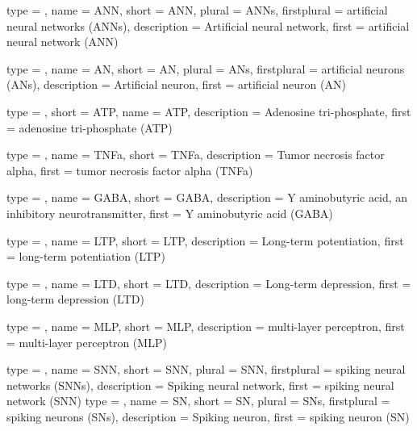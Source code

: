 %
%
%


{
	type        = \acronymtype,
	name        = {ANN},
	short       = {ANN},
	plural      = ANNs,
	firstplural = artificial neural networks (ANNs),
	description = {Artificial neural network},
	first       = {artificial neural network (ANN)}
}

{
	type        = \acronymtype,
	name        = {AN},
	short       = {AN},
	plural      = ANs,
	firstplural = artificial neurons (ANs),
	description = {Artificial neuron},
	first       = {artificial neuron (AN)}
}

{
	type        = \acronymtype,
	short       = {ATP},
  	name        = {ATP},
	description = {Adenosine tri-phosphate},
	first       = {adenosine tri-phosphate (ATP)}
}

{
	type        = \acronymtype,
   	name        = {TNFa},
	short       = {TNFa},
	description = {Tumor necrosis factor alpha},
	first       = {tumor necrosis factor alpha (TNFa)}
}

{
    type        = \acronymtype,
	name        = {GABA},
  	short       = {GABA},
	description = {Y aminobutyric acid, an inhibitory neurotransmitter},
	first       = {Y aminobutyric acid (GABA)}
}

{
	type        = \acronymtype,
	name        = {LTP},
	short       = {LTP},
	description = {Long-term potentiation},
	first       = {long-term potentiation (LTP)}
}

{
	type        = \acronymtype,
	name        = {LTD},
	short       = {LTD},
	description = {Long-term depression},
	first       = {long-term depression (LTD)}
}

{
	type        = \acronymtype,
	name        = {MLP},
	short       = {MLP},
	description = {multi-layer perceptron},
	first       = {multi-layer perceptron (MLP)}
}

{
	type        = \acronymtype,
	name        = {SNN},
	short       = {SNN},
	plural      = SNN,
	firstplural = spiking neural networks (SNNs),
	description = {Spiking neural network},
	first       = {spiking neural network (SNN)}
}
{
	type        = \acronymtype,
	name        = {SN},
	short       = {SN},
	plural      = SNs,
	firstplural = spiking neurons (SNs),
	description = {Spiking neuron},
	first       = {spiking neuron (SN)}
}

